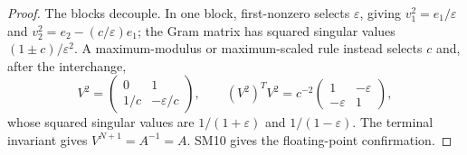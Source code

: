 \documentclass[review,onefignum,onetabnum]{siamart251216}
\begin{document}
\begin{proof}
The blocks decouple.  In one block, first-nonzero selects $\varepsilon$, giving
$v_1^2=e_1/\varepsilon$ and $v_2^2=e_2-(c/\varepsilon)e_1$; the Gram matrix has squared singular
values $(1\pm c)/\varepsilon^2$.  A maximum-modulus or maximum-scaled rule instead selects $c$ and,
after the interchange,
\[
V^2=\begin{pmatrix}0&1\\1/c&-\varepsilon/c\end{pmatrix},
\qquad
(V^2)^TV^2=c^{-2}\begin{pmatrix}1&-\varepsilon\\-\varepsilon&1\end{pmatrix},
\]
whose squared singular values are $1/(1+\varepsilon)$ and $1/(1-\varepsilon)$.  The terminal
invariant gives $V^{N+1}=A^{-1}=A$.  SM10 gives the floating-point confirmation.
\end{proof}
\end{document}

